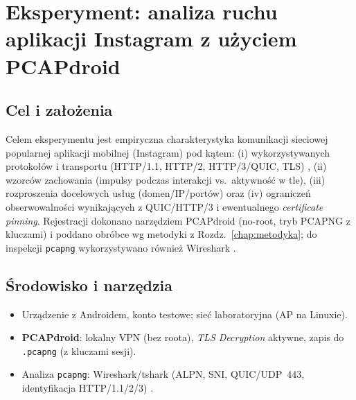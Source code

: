 
\chapter{Eksperyment: analiza ruchu aplikacji Instagram z użyciem PCAPdroid}
\label{chap:eksperyment-instagram}

\section{Cel i założenia}
Celem eksperymentu jest empiryczna charakterystyka komunikacji sieciowej popularnej aplikacji mobilnej (Instagram) pod kątem:
(i) wykorzystywanych protokołów i transportu (HTTP/1.1, HTTP/2, HTTP/3/QUIC, TLS) \cite{RFC8446,RFC9114,RFC9000},
(ii) wzorców zachowania (impulsy podczas interakcji vs.\ aktywność w tle),
(iii) rozproszenia docelowych usług (domen/IP/portów) oraz
(iv) ograniczeń obserwowalności wynikających z QUIC/HTTP/3 i ewentualnego \emph{certificate pinning}.
Rejestracji dokonano narzędziem PCAPdroid (no-root, tryb PCAPNG z kluczami) i poddano obróbce wg metodyki z Rozdz.\ \ref{chap:metodyka}; do inspekcji \texttt{pcapng} wykorzystywano również Wireshark \cite{WiresharkDocs}.

\section{Środowisko i narzędzia}
\begin{itemize}
  \item Urządzenie z Androidem, konto testowe; sieć laboratoryjna (AP na Linuxie).
  \item \textbf{PCAPdroid}: lokalny VPN (bez roota), \emph{TLS Decryption} aktywne, zapis do \texttt{.pcapng} (z kluczami sesji).
  \item Analiza \texttt{pcapng}: Wireshark/tshark (ALPN, SNI, QUIC/UDP~443, identyfikacja HTTP/1.1/2/3) \cite{WiresharkDocs,RFC9114,RFC9000}.
\end{itemize}

